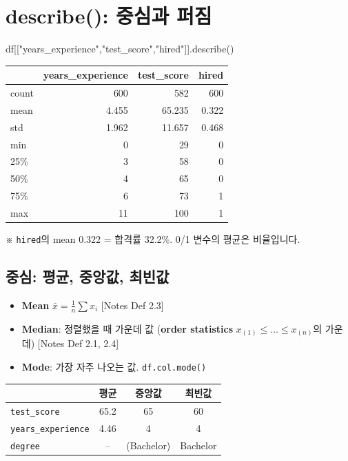 \documentclass[11pt,a4paper]{article}
\newcommand{\term}[1]{\textbf{#1}}
\newcommand{\code}[1]{\texttt{#1}}
\newcommand{\nref}[1]{{\footnotesize\textsf{\color{blue!55!black}[Notes #1]}}}
\newcommand{\aside}[1]{{\footnotesize\color{black!65}#1}}
\begin{document}
\section{describe(): 중심과 퍼짐}

\begin{codebox}
df[["years\_experience","test\_score","hired"]].describe()
\end{codebox}
\begin{center}
\begin{tabular}{@{}l r r r@{}}
\toprule
 & years\_experience & test\_score & hired \\
\midrule
count & 600 & 582 & 600 \\
mean & 4.455 & 65.235 & 0.322 \\
std & 1.962 & 11.657 & 0.468 \\
min & 0 & 29 & 0 \\
25\% & 3 & 58 & 0 \\
50\% & 4 & 65 & 0 \\
75\% & 6 & 73 & 1 \\
max & 11 & 100 & 1 \\
\bottomrule
\end{tabular}
\end{center}
\aside{※ \code{hired}의 mean 0.322 = 합격률 32.2\%. 0/1 변수의 평균은 비율입니다.}

\subsection{중심: 평균, 중앙값, 최빈값}
\begin{itemize}
\item \term{Mean} $\bar x=\frac1n\sum x_i$ \nref{Def 2.3}
\item \term{Median}: 정렬했을 때 가운데 값 (\term{order statistics} $x_{(1)}\le\dots\le x_{(n)}$의 가운데) \nref{Def 2.1, 2.4}
\item \term{Mode}: 가장 자주 나오는 값. \code{df.col.mode()}
\end{itemize}

\begin{center}
\begin{tabular}{@{}l c c c@{}}
\toprule
 & 평균 & 중앙값 & 최빈값 \\
\midrule
\code{test\_score} & 65.2 & 65 & 60 \\
\code{years\_experience} & 4.46 & 4 & 4 \\
\code{degree} & -- & (Bachelor) & Bachelor \\
\bottomrule
\end{tabular}
\end{center}
\end{document}
